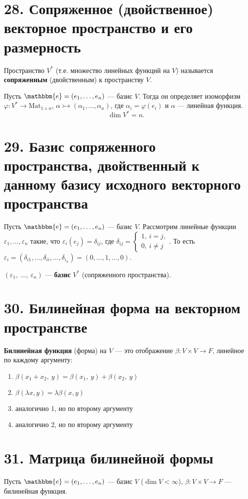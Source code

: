 \documentclass[a4paper, 12pt]{article}
\newcommand{\me}{\mathbbm{e}}
\begin{document}
\section*{28. Сопряженное (двойственное) векторное пространство и его размерность}
Пространство $V^*$ (т.е. множество линейных функций на $V$) называется \textbf{сопряженным} (двойственным) к пространству $V$.

Пусть $\me = (e_1, \ldots, e_n)$ --- базис $V$. Тогда он определяет изоморфизм $\varphi: V^* \rightarrow \text{Mat}_{1\times n}$, $\alpha \rightarrowtail (\alpha_1, \ldots, \alpha_n)$, где $\alpha_i = \varphi(e_i)$ и $\alpha$ --- линейная функция.
\[
\dim V^* = n.
\]

\section*{29. Базис сопряженного пространства, двойственный к данному базису исходного векторного пространства}
Пусть $\me = (e_1, \ldots, e_n)$ --- базис $V$. Рассмотрим линейные функции $\varepsilon_1, \ldots, \varepsilon_n$ такие, что $\varepsilon_i(e_j) = \delta_{ij}$, где $\delta_{ij} =
\begin{cases*}
1,\ i = j, \\
0,\ i \neq j
\end{cases*}$. То есть $\varepsilon_i = (\delta_{i1}, \ldots, \delta_{ii}, \ldots, \delta_{i_n}) = (0, \ldots, 1, \ldots, 0)$.

$(\varepsilon_1,\ \ldots,\ \varepsilon_n)$ --- \textbf{базис} $V^*$ (сопряженного пространства).

\section*{30. Билинейная форма на векторном пространстве}
\textbf{Билинейная функция} (форма) на $V$ --- это отображение $\beta: V\times V\rightarrow F$, линейное по каждому аргументу:
\vspace{-2mm}
\begin{enumerate}
    \itemsep=-0.3em
    \item $\beta(x_1 + x_2,\ y) = \beta(x_1,\ y) + \beta(x_2,\ y)$
    \item $\beta(\lambda x, y) = \lambda\beta(x, y)$
    \item аналогично 1, но по второму аргументу
    \item аналогично 2, но по второму аргументу
\end{enumerate}

\section*{31. Матрица билинейной формы}
Пусть $\me = (e_1, \ldots, e_n)$ --- базис $V$ ($\dim V < \infty$), $\beta: V\times V \rightarrow F$ --- билинейная функция.
\end{document}

